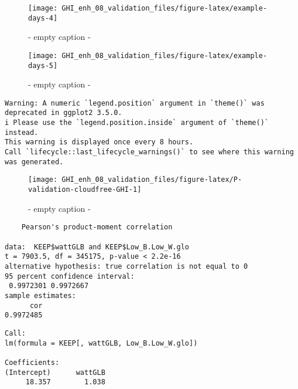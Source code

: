 \documentclass[
  10pt,
  a4paper,oneside]{article}
\begin{document}
\begin{figure}[H]

{\centering \texttt{[image: GHI\_enh\_08\_validation\_files/figure-latex/example-days-4]} 

}

\caption{ - empty caption - }\label{fig:example-days-4}
\end{figure}

\begin{figure}[H]

{\centering \texttt{[image: GHI\_enh\_08\_validation\_files/figure-latex/example-days-5]} 

}

\caption{ - empty caption - }\label{fig:example-days-5}
\end{figure}

\newpage

\begin{verbatim}
Warning: A numeric `legend.position` argument in `theme()` was deprecated in ggplot2 3.5.0.
i Please use the `legend.position.inside` argument of `theme()` instead.
This warning is displayed once every 8 hours.
Call `lifecycle::last_lifecycle_warnings()` to see where this warning was generated.
\end{verbatim}

\begin{figure}[H]

{\centering \texttt{[image: GHI\_enh\_08\_validation\_files/figure-latex/P-validation-cloudfree-GHI-1]} 

}

\caption{ - empty caption - }\label{fig:P-validation-cloudfree-GHI}
\end{figure}

\begin{verbatim}
    Pearson's product-moment correlation

data:  KEEP$wattGLB and KEEP$Low_B.Low_W.glo
t = 7903.5, df = 345175, p-value < 2.2e-16
alternative hypothesis: true correlation is not equal to 0
95 percent confidence interval:
 0.9972301 0.9972667
sample estimates:
      cor 
0.9972485 
\end{verbatim}

\begin{verbatim}
Call:
lm(formula = KEEP[, wattGLB, Low_B.Low_W.glo])

Coefficients:
(Intercept)      wattGLB  
     18.357        1.038  
\end{verbatim}
\end{document}

